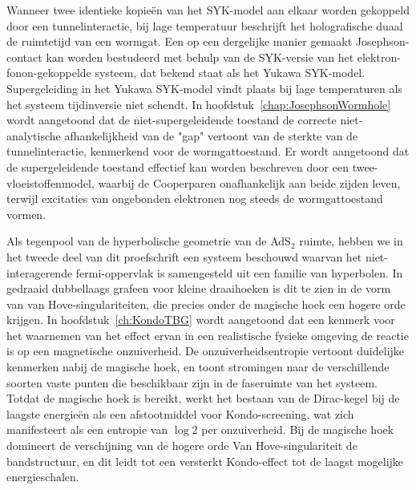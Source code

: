 Wanneer twee identieke kopieën van het SYK-model aan elkaar worden gekoppeld door een tunnelinteractie, bij lage temperatuur beschrijft het holografische duaal de ruimtetijd van een wormgat. Een op een dergelijke manier gemaakt Josephson-contact kan worden bestudeerd met behulp van de SYK-versie van het elektron-fonon-gekoppelde systeem, dat bekend staat als het Yukawa SYK-model. Supergeleiding in het Yukawa SYK-model vindt plaats bij lage temperaturen als het systeem tijdinversie niet schendt. In hoofdstuk~\ref{chap:JosephsonWormhole} wordt aangetoond dat de niet-supergeleidende toestand de correcte niet-analytische afhankelijkheid van de "gap" vertoont van de sterkte van de tunnelinteractie, kenmerkend voor de wormgattoestand. Er wordt aangetoond dat de supergeleidende toestand effectief kan worden beschreven door een twee-vloeistoffenmodel, waarbij de Cooperparen onafhankelijk aan beide zijden leven, terwijl excitaties van ongebonden elektronen nog steeds de wormgattoestand vormen.
\par
Als tegenpool van de hyperbolische geometrie van de AdS${}_2$ ruimte, hebben we in het tweede deel van dit proefschrift een systeem beschouwd waarvan het niet-interagerende fermi-oppervlak is samengesteld uit een familie van hyperbolen. In gedraaid dubbellaags grafeen voor kleine draaihoeken is dit te zien in de vorm van van Hove-singulariteiten, die precies onder de magische hoek een hogere orde krijgen. In hoofdstuk~\ref{ch:KondoTBG} wordt aangetoond dat een kenmerk voor het waarnemen van het effect ervan in een realistische fysieke omgeving de reactie is op een magnetische onzuiverheid. De onzuiverheidsentropie vertoont duidelijke kenmerken nabij de magische hoek, en toont stromingen naar de verschillende soorten vaste punten die beschikbaar zijn in de faseruimte van het systeem. Totdat de magische hoek is bereikt, werkt het bestaan van de Dirac-kegel bij de laagste energieën als een afstootmiddel voor Kondo-screening, wat zich manifesteert als een entropie van $\log 2$ per onzuiverheid. Bij de magische hoek domineert de verschijning van de hogere orde Van Hove-singulariteit de bandstructuur, en dit leidt tot een versterkt Kondo-effect tot de laagst mogelijke energieschalen.

\newpage
\thispagestyle{empty}